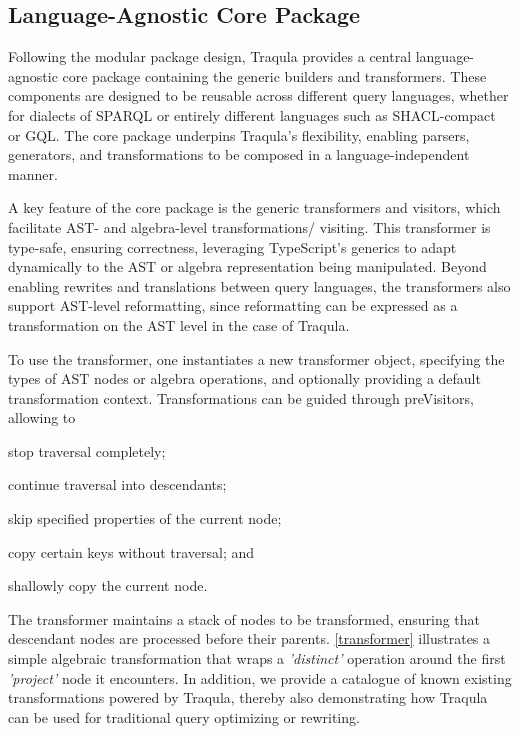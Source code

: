 \documentclass[runningheads]{llncs}
\begin{document}
    \subsection{Language-Agnostic Core Package}

    Following the modular package design, Traqula provides a central language-agnostic core package containing the generic builders and transformers.
    These components are designed to be reusable across different query languages,
    whether for dialects of SPARQL or entirely different languages such as SHACL-compact or GQL.
    The core package underpins Traqula's flexibility, enabling parsers, generators, and transformations to be composed in a language-independent manner.

    A key feature of the core package is the generic transformers and visitors,
    which facilitate AST- and algebra-level transformations/ visiting.
    This transformer is type-safe, ensuring correctness, leveraging TypeScript's generics to adapt dynamically to the AST or algebra representation being manipulated.
    Beyond enabling rewrites and translations between query languages,
    the transformers also support AST-level reformatting, since reformatting can be expressed as a transformation on the AST level in the case of Traqula.

    To use the transformer, one instantiates a new transformer object, specifying the types of AST nodes or algebra operations,
    and optionally providing a default transformation context.
    Transformations can be guided through preVisitors, allowing to
    \begin{enumerate*}[label=\arabic*.]
    \item stop traversal completely;
    \item continue traversal into descendants;
    \item skip specified properties of the current node;
    \item copy certain keys without traversal; and
    \item shallowly copy the current node.
    \end{enumerate*}
    The transformer maintains a stack of nodes to be transformed, ensuring that descendant nodes are processed before their parents.
    \autoref{transformer} illustrates a simple algebraic transformation that wraps a \textit{'distinct'} operation around the first \textit{'project'} node it encounters.
    In addition, we provide
    a catalogue of known existing transformations powered by Traqula,
    thereby also demonstrating how Traqula can be used for traditional query optimizing or rewriting.
\end{document}
